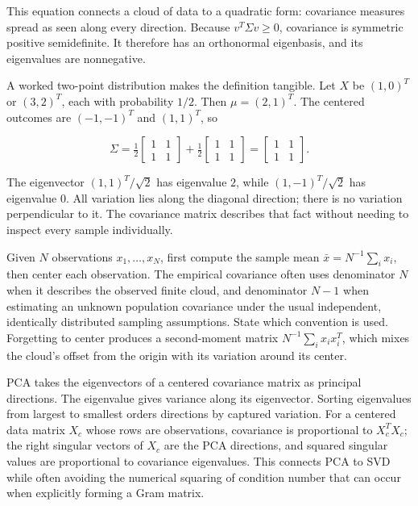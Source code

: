 This equation connects a cloud of data to a quadratic form: covariance measures spread as seen along every direction. Because \(v^T\Sigma v\ge 0\), covariance is symmetric positive semidefinite. It therefore has an orthonormal eigenbasis, and its eigenvalues are nonnegative.

A worked two-point distribution makes the definition tangible. Let \(X\) be \((1,0)^T\) or \((3,2)^T\), each with probability \(1/2\). Then \(\mu=(2,1)^T\). The centered outcomes are \((-1,-1)^T\) and \((1,1)^T\), so

\[
\Sigma=\tfrac12\begin{bmatrix}1&1\\1&1\end{bmatrix}
+\tfrac12\begin{bmatrix}1&1\\1&1\end{bmatrix}
=\begin{bmatrix}1&1\\1&1\end{bmatrix}.
\]

The eigenvector \((1,1)^T/\sqrt2\) has eigenvalue \(2\), while \((1,-1)^T/\sqrt2\) has eigenvalue \(0\). All variation lies along the diagonal direction; there is no variation perpendicular to it. The covariance matrix describes that fact without needing to inspect every sample individually.

Given \(N\) observations \(x_1,\ldots,x_N\), first compute the sample mean \(\bar x=N^{-1}\sum_i x_i\), then center each observation. The empirical covariance often uses denominator \(N\) when it describes the observed finite cloud, and denominator \(N-1\) when estimating an unknown population covariance under the usual independent, identically distributed sampling assumptions. State which convention is used. Forgetting to center produces a second-moment matrix \(N^{-1}\sum_i x_ix_i^T\), which mixes the cloud's offset from the origin with its variation around its center.

PCA takes the eigenvectors of a centered covariance matrix as principal directions. The eigenvalue gives variance along its eigenvector. Sorting eigenvalues from largest to smallest orders directions by captured variation. For a centered data matrix \(X_c\) whose rows are observations, covariance is proportional to \(X_c^TX_c\); the right singular vectors of \(X_c\) are the PCA directions, and squared singular values are proportional to covariance eigenvalues. This connects PCA to SVD while often avoiding the numerical squaring of condition number that can occur when explicitly forming a Gram matrix.

